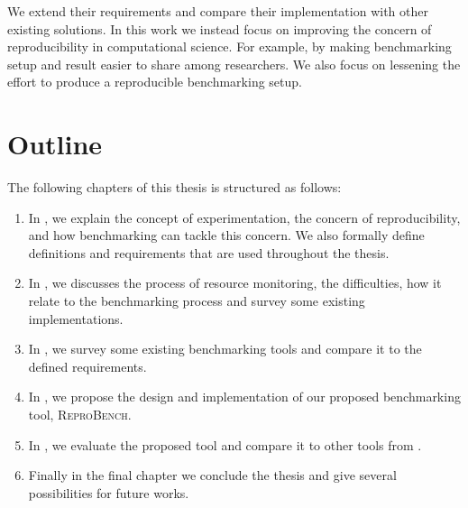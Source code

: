 We extend their requirements and compare their implementation with other existing solutions.
In this work we instead focus on improving the concern of reproducibility in computational science.
For example, by making benchmarking setup and result easier to share among researchers.
We also focus on lessening the effort to produce a reproducible benchmarking setup.


\section{Outline}
\label{sec:intro.outline}

The following chapters of this thesis is structured as follows:

\begin{enumerate}
	\item In , we explain the concept of experimentation, the concern of reproducibility, and how benchmarking can tackle this concern. We also formally define definitions and requirements that are used throughout the thesis.
	\item In , we discusses the process of resource monitoring, the difficulties, how it relate to the benchmarking process and survey some existing implementations.
	\item In , we survey some existing benchmarking tools and compare it to the defined requirements.
	\item In , we propose the design and implementation of our proposed benchmarking tool, \textsc{ReproBench}.
	\item In , we evaluate the proposed tool and compare it to other tools from .
	\item Finally in the final chapter we conclude the thesis and give several possibilities for future works.
\end{enumerate}

